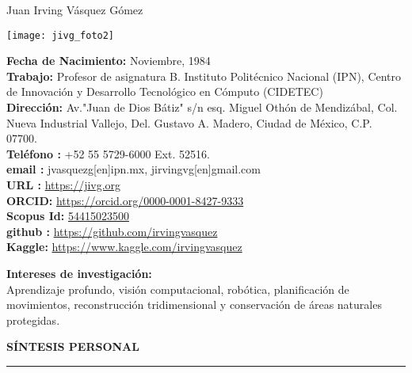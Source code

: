 \documentclass[10pt]{article}
\begin{document}
\begin{center}
{\huge Juan Irving Vásquez Gómez}
\vspace{0.5cm}


\begin{minipage}[b]{0.30\linewidth}
	\centering
\texttt{[image: jivg\_foto2]}
\end{minipage}
\hspace{0.5cm}
\begin{minipage}[b]{0.65\linewidth}
\textbf{Fecha de Nacimiento:} Noviembre, 1984 \\
\textbf{Trabajo:} Profesor de asignatura B. Instituto Politécnico Nacional (IPN), Centro de Innovación y Desarrollo Tecnológico en Cómputo (CIDETEC) \href{https://www.cidetec.ipn.mx/}{\faExternalLink} \\ 
\textbf{Dirección:} Av."Juan de Dios Bátiz" s/n esq. Miguel Othón de Mendizábal, 
Col. Nueva Industrial Vallejo, Del. Gustavo A. Madero, Ciudad de México, C.P. 07700. \\
\textbf{Teléfono \faPhone:} +52 55 5729-6000 Ext. 52516. \\
\textbf{email \faEnvelopeO:} jvasquezg[en]ipn.mx, jirvingvg[en]gmail.com\\
\textbf{URL \faExternalLink:} \url{https://jivg.org} \\
\textbf{ORCID:} \url{https://orcid.org/0000-0001-8427-9333}\\
\textbf{Scopus Id:} \href{https://www.scopus.com/authid/detail.uri?authorId=54415023500}{54415023500}\\
\textbf{github \faGithub :} \url{https://github.com/irvingvasquez} \\
\textbf{Kaggle:} \url{https://www.kaggle.com/irvingvasquez}\\
\end{minipage}

\end{center}

\begin{center}
{\bf Intereses de investigación:} \\ Aprendizaje profundo, visión computacional, robótica, planificación de movimientos, reconstrucción tridimensional y conservación de áreas naturales protegidas. 
\end{center}

{\bf SÍNTESIS PERSONAL}
\vspace{3pt}
\hrule
\end{document}
